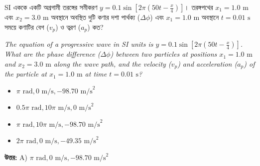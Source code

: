 \documentclass[12pt, a4paper]{article}
\begin{document}
\begin{tcolorbox}[questionbox={প্রশ্ন (Question) 12}]
    \noindent
    SI এককে একটি অগ্রগামী তরঙ্গের সমীকরণ $y = 0.1 \sin\left[2\pi\left(50t - \frac{x}{4}\right)\right]$। তরঙ্গপথের $x_1 = 1.0\text{ m}$ এবং $x_2 = 3.0\text{ m}$ অবস্থানে অবস্থিত দুটি কণার দশা পার্থক্য ($\Delta \phi$) এবং $x_1 = 1.0\text{ m}$ অবস্থানে $t = 0.01\text{ s}$ সময়ে কণাটির বেগ ($v_p$) ও ত্বরণ ($a_p$) কত?
    
    \vspace{0.8em}
    \begin{english}
    \noindent\textit{\color{darkgray}
    The equation of a progressive wave in SI units is $y = 0.1 \sin\left[2\pi\left(50t - \frac{x}{4}\right)\right]$. What are the phase difference ($\Delta \phi$) between two particles at positions $x_1 = 1.0\text{ m}$ and $x_2 = 3.0\text{ m}$ along the wave path, and the velocity ($v_p$) and acceleration ($a_p$) of the particle at $x_1 = 1.0\text{ m}$ at time $t = 0.01\text{ s}$?
    }
    \end{english}
\end{tcolorbox}

\begin{itemize}[label={}, leftmargin=1cm, itemsep=0.5em]
    \item[\textbf{A)}] $\pi\text{ rad}, 0\text{ m/s}, -98.70\text{ m/s}^2$
    \item[\textbf{B)}] $0.5\pi\text{ rad}, 10\pi\text{ m/s}, 0\text{ m/s}^2$
    \item[\textbf{C)}] $\pi\text{ rad}, 10\pi\text{ m/s}, -98.70\text{ m/s}^2$
    \item[\textbf{D)}] $2\pi\text{ rad}, 0\text{ m/s}, -49.35\text{ m/s}^2$
\end{itemize}

\vspace{0.5em}
\begin{tcolorbox}[answerbox]
    \textbf{\color{success} উত্তর:} A) $\pi\text{ rad}, 0\text{ m/s}, -98.70\text{ m/s}^2$
\end{tcolorbox}
\vspace{1em}
\end{document}
